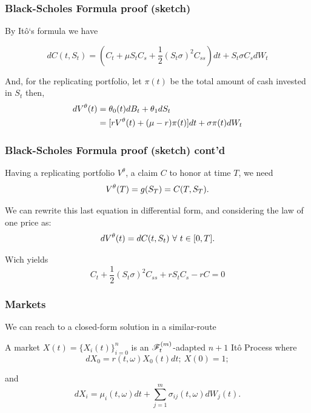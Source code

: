 \documentclass{beamer}
\begin{document}
\begin{frame}
\frametitle{Black-Scholes Formula proof (sketch)}
	By It\^o`s formula we have

\begin{equation}
	dC(t, S_t) = \left(C_t + \mu S_t C_s + \frac{1}{2}(S_t\sigma)^2C_{ss} \right) dt  + S_t\sigma C_s dW_t \label{eqproof:claim_bs}
\end{equation}

And, for the replicating portfolio, let $\pi(t)$ be the total amount of cash invested in $S_t$ then,
\begin{align}
	dV^\theta(t) &= \theta_0(t)dB_t  + \theta_1 dS_t \nonumber \\
					&= [rV^\theta(t) + (\mu - r) \pi(t)] dt + \sigma\pi(t) dW_t \label{eqproof:portfolio_bs}
\end{align}
\end{frame}

\begin{frame}
\frametitle{Black-Scholes Formula proof (sketch) cont'd}
	Having a replicating portfolio $V^\theta$, a claim $C$ to honor at time $T$, we need	
\begin{equation}
	V^\theta(T) = g(S_T) = C(T, S_T).
\end{equation}

We can rewrite this last equation in differential form, and considering the law of one price as:
\[
	dV^\theta(t) = dC(t, S_t) \ \forall \ t \in [0,T].
\]

Wich yields
\begin{equation}
  C_t + \frac{1}{2}(S_t\sigma)^2C_{ss} + rS_t C_s - rC = 0
\end{equation}
\end{frame}


\begin{frame}
\frametitle{Markets}

We can reach to a closed-form solution in a similar-route
\begin{definition}
A market $X(t) = \{X_i(t)\}_{i=0}^n$ is an $\mathscr{F}^{(m)}_t$-adapted $n+1$ It\^o Process where
\begin{equation}
	dX_0 = r(t,\omega) X_0(t) dt; \ X(0) = 1; \label{eq:safe_investment}
\end{equation} 

and
\begin{equation}
	dX_i = \mu_i(t,\omega) dt + \sum_{j=1}^{m}\sigma_{ij}(t,\omega)dW_j(t) \label{eq:risky_asset}.
\end{equation}
\end{definition}
\end{frame}
\end{document}
